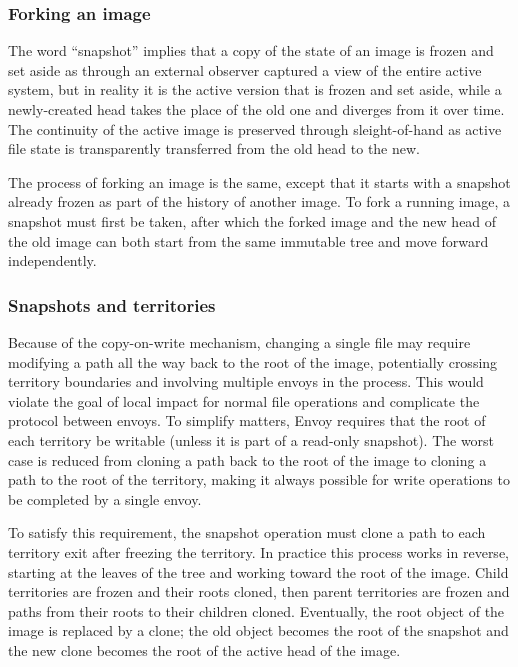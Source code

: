 \subsubsection{Forking an image}

The word ``snapshot'' implies that a copy of the state of an image is frozen and set aside as through an external observer captured a view of the entire active system, but in reality it is the active version that is frozen and set aside, while a newly-created head takes the place of the old one and diverges from it over time. The continuity of the active image is preserved through sleight-of-hand as active file state is transparently transferred from the old head to the new.

The process of forking an image is the same, except that it starts with a snapshot already frozen as part of the history of another image. To fork a running image, a snapshot must first be taken, after which the forked image and the new head of the old image can both start from the same immutable tree and move forward independently.

\subsubsection{Snapshots and territories}

Because of the copy-on-write mechanism, changing a single file may require modifying a path all the way back to the root of the image, potentially crossing territory boundaries and involving multiple envoys in the process. This would violate the goal of local impact for normal file operations and complicate the protocol between envoys. To simplify matters, Envoy requires that the root of each territory be writable (unless it is part of a read-only snapshot). The worst case is reduced from cloning a path back to the root of the image to cloning a path to the root of the territory, making it always possible for write operations to be completed by a single envoy.

To satisfy this requirement, the snapshot operation must clone a path to each territory exit after freezing the territory. In practice this process works in reverse, starting at the leaves of the tree and working toward the root of the image. Child territories are frozen and their roots cloned, then parent territories are frozen and paths from their roots to their children cloned. Eventually, the root object of the image is replaced by a clone; the old object becomes the root of the snapshot and the new clone becomes the root of the active head of the image.

